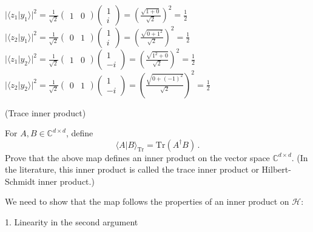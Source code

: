 \documentclass[12pt]{article}
\renewcommand{\>}{\rangle}
\newcommand{\<}{\langle}
\newcommand{\C}{\mathbb{C}}
\begin{document}
\noindent
$|\<z_1 | y_1 \>|^2 = \frac{1}{\sqrt 2} \left(\begin{array}{cc} 1 & 0 \end{array}\right)  \left(\begin{array}{cc} 1 \\ i\end{array}\right) = \left( \frac{\sqrt{1 + 0}}{\sqrt 2}\right)^2 = \frac{1}{2} $ \\
$|\<z_2 | y_1 \>|^2 = \frac{1}{\sqrt 2} \left(\begin{array}{cc} 0 & 1\end{array}\right)  \left(\begin{array}{cc} 1 \\ i\end{array}\right) = \left( \frac{\sqrt{0 + 1^2}}{\sqrt 2}\right)^2 = \frac{1}{2} $ \\
$|\<z_1 | y_2 \>|^2 = \frac{1}{\sqrt 2} \left(\begin{array}{cc} 1 & 0\end{array}\right)  \left(\begin{array}{cc} 1 \\ -i\end{array}\right) = \left( \frac{\sqrt{1^2 + 0}}{\sqrt 2}\right)^2  = \frac{1}{2} $ \\
$|\<z_2 | y_2 \>|^2 = \frac{1}{\sqrt 2} \left(\begin{array}{cc} 0 & 1\end{array}\right)  \left(\begin{array}{cc} 1 \\ -i\end{array}\right) = \left( \frac{\sqrt{0 + (-1)^2}}{\sqrt 2}\right)^2 = \frac{1}{2} $


\newpage


 (Trace inner product)

\medskip
\noindent
For $A,B\in\C^{d\times d}$, define
\[
\< A | B\>_{\mathrm{Tr}} = \mathrm{Tr}(A^\dagger B)\,.
\]
Prove that the above map defines an inner product on the vector space $\C^{d\times d}$. (In the literature, this inner product is called the trace inner product or Hilbert-Schmidt inner product.)

\noindent
\newline
We need to show that the map follows the properties of an inner product on $\mathcal{H}$:

1. Linearity in the second argument \\
	
\end{document}

